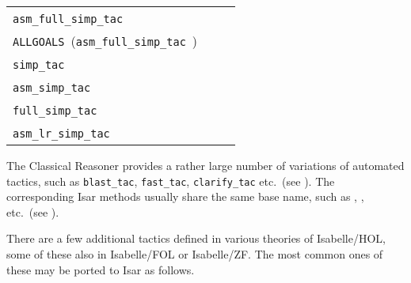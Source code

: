 \begin{isabellebody}
\begin{isamarkuptext}
  \medskip
  \begin{tabular}{lll}
    \verb|asm_full_simp_tac|~\isa{{\isachardoublequote}{\isacharat}{\isacharbraceleft}simpset{\isacharbraceright}\ {\isadigit{1}}{\isachardoublequote}} & & \hyperlink{method.simp}{\mbox{\isa{simp}}} \\
    \verb|ALLGOALS|~(\verb|asm_full_simp_tac|~\isa{{\isachardoublequote}{\isacharat}{\isacharbraceleft}simpset{\isacharbraceright}{\isachardoublequote}}) & & \hyperlink{method.simp-all}{\mbox{\isa{simp{\isacharunderscore}all}}} \\[0.5ex]
    \verb|simp_tac|~\isa{{\isachardoublequote}{\isacharat}{\isacharbraceleft}simpset{\isacharbraceright}\ {\isadigit{1}}{\isachardoublequote}} & & \hyperlink{method.simp}{\mbox{\isa{simp}}}~\isa{{\isachardoublequote}{\isacharparenleft}no{\isacharunderscore}asm{\isacharparenright}{\isachardoublequote}} \\
    \verb|asm_simp_tac|~\isa{{\isachardoublequote}{\isacharat}{\isacharbraceleft}simpset{\isacharbraceright}\ {\isadigit{1}}{\isachardoublequote}} & & \hyperlink{method.simp}{\mbox{\isa{simp}}}~\isa{{\isachardoublequote}{\isacharparenleft}no{\isacharunderscore}asm{\isacharunderscore}simp{\isacharparenright}{\isachardoublequote}} \\
    \verb|full_simp_tac|~\isa{{\isachardoublequote}{\isacharat}{\isacharbraceleft}simpset{\isacharbraceright}\ {\isadigit{1}}{\isachardoublequote}} & & \hyperlink{method.simp}{\mbox{\isa{simp}}}~\isa{{\isachardoublequote}{\isacharparenleft}no{\isacharunderscore}asm{\isacharunderscore}use{\isacharparenright}{\isachardoublequote}} \\
    \verb|asm_lr_simp_tac|~\isa{{\isachardoublequote}{\isacharat}{\isacharbraceleft}simpset{\isacharbraceright}\ {\isadigit{1}}{\isachardoublequote}} & & \hyperlink{method.simp}{\mbox{\isa{simp}}}~\isa{{\isachardoublequote}{\isacharparenleft}asm{\isacharunderscore}lr{\isacharparenright}{\isachardoublequote}} \\
  \end{tabular}
  \medskip%
\end{isamarkuptext}%
\isamarkuptrue%
%
\isamarkuptrue%
%
\begin{isamarkuptext}%
The Classical Reasoner provides a rather large number of variations
  of automated tactics, such as \verb|blast_tac|, \verb|fast_tac|, \verb|clarify_tac| etc.\ (see \cite{isabelle-ref}).  The corresponding
  Isar methods usually share the same base name, such as \hyperlink{method.blast}{\mbox{}}, \hyperlink{method.fast}{\mbox{}}, \hyperlink{method.clarify}{\mbox{}} etc.\ (see
  ).%
\end{isamarkuptext}%
\isamarkuptrue%
%
\isamarkuptrue%
%
\begin{isamarkuptext}%
There are a few additional tactics defined in various theories of
  Isabelle/HOL, some of these also in Isabelle/FOL or Isabelle/ZF.
  The most common ones of these may be ported to Isar as follows.


\end{isamarkuptext}
\end{isabellebody}
